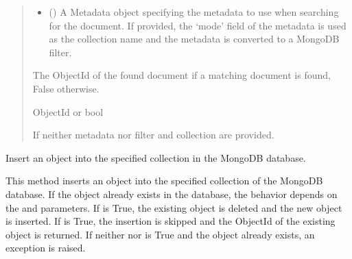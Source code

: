 \documentclass[letterpaper,10pt,english]{sphinxmanual}
\begin{document}
\begin{fulllineitems}
\begin{fulllineitems}
\begin{quote}
\begin{description}
\begin{itemize}
\item {} 
\sphinxAtStartPar
{} (\sphinxstyleliteralemphasis{\sphinxupquote{, }}) \textendash{} A Metadata object specifying the metadata to use when searching for the document.
If provided, the ‘mode’ field of the metadata is used as the collection name and
the metadata is converted to a MongoDB filter.

\end{itemize}

\sphinxAtStartPar
The ObjectId of the found document if a matching document is found, False otherwise.

\sphinxAtStartPar
ObjectId or bool

\sphinxAtStartPar
{} \textendash{} If neither metadata nor filter and collection are provided.

\end{description}\end{quote}

\end{fulllineitems}


\begin{fulllineitems}
\label{\detokenize{forensicfit.database.database:forensicfit.database.database.Database.insert}}
\pysigstartsignatures
{}
\pysigstopsignatures
\sphinxAtStartPar
Insert an object into the specified collection in the MongoDB database.

\sphinxAtStartPar
This method inserts an object into the specified collection of the MongoDB database.
If the object already exists in the database, the behavior depends on the 
and  parameters. If  is True, the existing object is deleted and the
new object is inserted. If  is True, the insertion is skipped and the ObjectId
of the existing object is returned. If neither  nor  is True and the
object already exists, an exception is raised.
\begin{quote}\begin{description}
\sphinxAtStartPar
{}


\end{description}
\end{quote}
\end{fulllineitems}
\end{fulllineitems}
\end{document}
